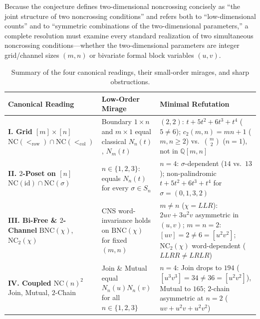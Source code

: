 \documentclass[11pt]{article}
\theoremstyle{plain}
\theoremstyle{definition}
\newcommand{\NC}{\mathrm{NC}}
\newcommand{\BNC}{\mathrm{BNC}}
\newcommand{\Q}{\mathbb{Q}}
\begin{document}
Because the conjecture defines two-dimensional noncrossing concisely as ``the joint structure of two noncrossing conditions'' and refers both to ``low-dimensional counts'' and to ``symmetric combinations of the two-dimensional parameters,'' a complete resolution must examine every standard realization of two simultaneous noncrossing conditions---whether the two-dimensional parameters are integer grid/channel sizes $(m, n)$ or bivariate formal block variables $(u, v)$.

\begin{table}[ht]
\centering
\small
\begin{tabular}{@{}>{\raggedright\arraybackslash}p{}>{\raggedright\arraybackslash}p{}>{\raggedright\arraybackslash}p{}@{}}
\toprule
\textbf{Canonical Reading} & \textbf{Low-Order Mirage} & \textbf{Minimal Refutation} \\
\midrule
\textbf{I. Grid $[m] \times [n]$} \newline $\NC(<_{\mathrm{row}}) \cap \NC(<_{\mathrm{col}})$ & Boundary $1 \times n$ and $m \times 1$ equal classical $N_n(t)$, $N_m(t)$ & $(2,2)$: $t + 5t^2 + 6t^3 + t^4$ ($5 \ne 6$); $c_2(m,n) = mn + 1$ ($m,n \ge 2$) vs.\ $\binom{m}{2}$ ($n=1$), not in $\Q[m,n]$ \\
\addlinespace[4pt]
\textbf{II. $2$-Poset on $[n]$} \newline $\NC(\mathrm{id}) \cap \NC(\sigma)$ & $n \in \{1,2,3\}$: equals $N_n(t)$ for every $\sigma \in S_n$ & $n = 4$: $\sigma$-dependent ($14$ vs.\ $13$); non-palindromic $t + 5t^2 + 6t^3 + t^4$ for $\sigma = (0,1,3,2)$ \\
\addlinespace[4pt]
\textbf{III. Bi-Free \& $2$-Channel} \newline $\BNC(\chi)$, $\NC_2(\chi)$ & CNS word-invariance holds on $\BNC(\chi)$ for fixed $(m,n)$ & $m \ne n$ ($\chi = LLR$): $2uv + 3u^2v$ asymmetric in $(u,v)$; $m=n=2$: $[uv]=2 \ne 6=[u^2v^2]$; $\NC_2(\chi)$ word-dependent ($LLRR \ne LRLR$) \\
\addlinespace[4pt]
\textbf{IV. Coupled $\NC(n)^2$} \newline Join, Mutual, $2$-Chain & Join \& Mutual equal $N_n(u)N_n(v)$ for all $n \in \{1,2,3\}$ & $n = 4$: Join drops to $194$ ($[u^3v^3]=34 \ne 36=[u^2v^2]$), Mutual to $165$; $2$-chain asymmetric at $n=2$ ($uv + u^2v + u^2v^2$) \\
\bottomrule
\end{tabular}
\caption{Summary of the four canonical readings, their small-order mirages, and sharp obstructions.}
\label{tab:overview}
\end{table}
\end{document}
